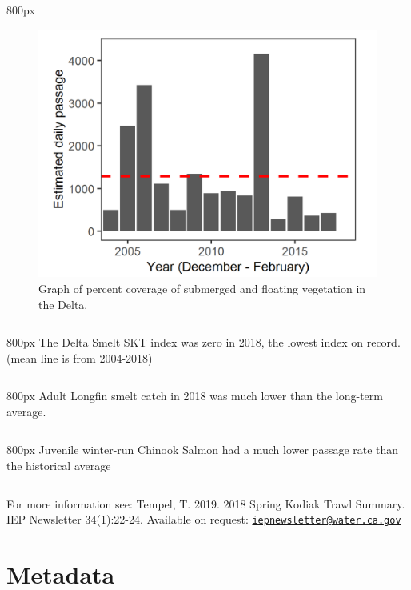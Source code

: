 \documentclass[
]{book}
\begin{document}
\begin{column}{800px\textwidth}
\begin{figure}
\includegraphics[width=15.25in]{figures/redbluff_2003} \caption{Graph of percent coverage of submerged and floating vegetation in the Delta.}\label{fig:unnamed-chunk-184}
\end{figure}
\end{column}

\begin{column}{800px\textwidth}
The Delta Smelt SKT index was zero in 2018, the lowest index on record. (mean line is from 2004-2018)
\end{column}

\begin{column}{800px\textwidth}
Adult Longfin smelt catch in 2018 was much lower than the long-term average.
\end{column}

\begin{column}{800px\textwidth}
Juvenile winter-run Chinook Salmon had a much lower passage rate than the historical average
\end{column}

\begin{disclaimer}
For more information see: Tempel, T. 2019. 2018 Spring Kodiak Trawl
Summary. IEP Newsletter 34(1):22-24. Available on request:
\href{mailto:iepnewsletter@water.ca.gov}{\nolinkurl{iepnewsletter@water.ca.gov}}
\end{disclaimer}

\hypertarget{metadata}{%
\chapter{Metadata}\label{metadata}}
\end{document}
